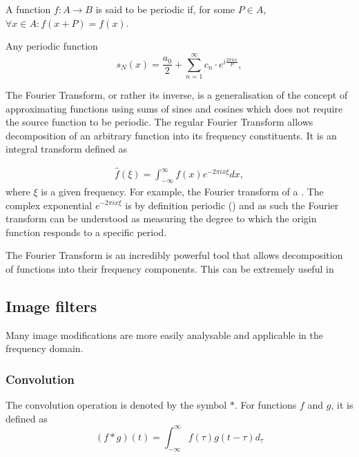 \begin{definition}
A function $f: A \rightarrow B$ is said to be periodic if, for some $P\in A$, $\forall x\in A: f(x+P) = f(x)$.
\end{definition}

\begin{definition}
Any periodic function 
\begin{equation}
    s_N(x) = \frac{a_0}{2} + \sum_{n=1}^\infty c_n \cdot e^{i\frac{2\pi n x}{P}},
\end{equation}

\end{definition}

The Fourier Transform, or rather its inverse, is a generalisation of the concept of approximating functions using sums of sines and cosines which does not require the source function to be periodic. The regular Fourier Transform allows decomposition of an arbitrary function into its frequency constituents. It is an integral transform defined as

\begin{align*}
	\hat{f}(\xi) = \int_{-\infty}^{\infty} f(x) e^{-2\pi i x\xi}dx,
\end{align*}
where $\xi$ is a given frequency. For example, the Fourier transform of a . The complex exponential $e^{-2\pi i x\xi}$ is by definition periodic () and as such the Fourier transform can be understood as measuring the degree to which the origin function responds to a specific period.

The Fourier Transform is an incredibly powerful tool that allows decomposition of functions into their frequency components. This can be extremely useful in 



\subsection{Image filters}
Many image modifications are more easily analysable and applicable in the frequency domain. 

\subsubsection{Convolution}

\begin{definition}[Convolution]
The convolution operation is denoted by the symbol $*$. For functions $f$ and $g$, it is defined as 
\begin{equation}
    (f*g)(t) = \int_{-\infty}^\infty f(\tau)g(t-\tau)d_\tau
\end{equation}
\end{definition}

